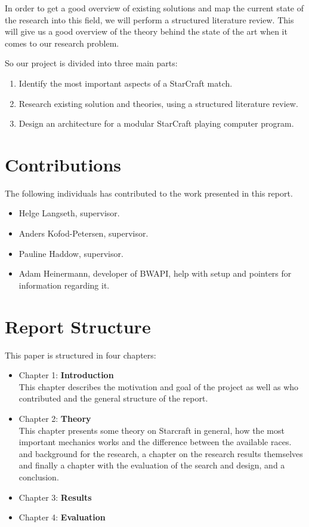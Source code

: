 In order to get a good overview of existing solutions and map the current state
of the research into this field, we will perform a structured literature review.
This will give us a good overview of the theory behind the state of the art
when it comes to our research problem.

So our project is divided into three main parts:
\begin{enumerate}
  \item Identify the most important aspects of a StarCraft match.
  \item Research existing solution and theories, using a structured literature
review.
  \item Design an architecture for a modular StarCraft playing computer program.
\end{enumerate}

\section{Contributions}
The following individuals has contributed to the work presented in this report.

\begin{itemize}
 \item Helge Langseth, supervisor.
 \item Anders Kofod-Petersen, supervisor.
 \item Pauline Haddow, supervisor.
 \item Adam Heinermann, developer of BWAPI, help with setup and pointers for
information regarding it.
\end{itemize}

\section{Report Structure}
This paper is structured in four chapters:
\begin{itemize}
\item Chapter 1: \textbf{Introduction} \\
This chapter describes the motivation and goal of the project as well as who contributed and the general structure of the report.
\item Chapter 2: \textbf{Theory} \\
This chapter presents some theory on Starcraft in general, how the most important mechanics works and the difference between the available races.  and background for the research, a
chapter on the research results themselves and finally a chapter with the
evaluation of the search and design, and a conclusion.
\item Chapter 3: \textbf{Results} \\

\item Chapter 4: \textbf{Evaluation} \\

\end{itemize}